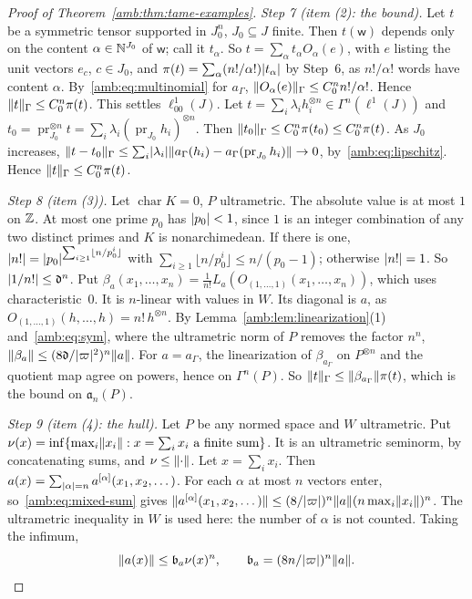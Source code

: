 \begin{proof}[Proof of Theorem~\ref{amb:thm:tame-examples}]
\emph{Step 7 (item (2): the bound).} Let $t$ be a symmetric tensor supported in $J_0^n$, $J_0\subseteq J$ finite. Then $t(\mathsf w)$
depends only on the content $\alpha\in\mathbb N^{J_0}$ of $\mathsf w$; call it $t_\alpha$. So $t=\sum_\alpha t_\alpha O_\alpha(e)$, with $e$
listing the unit vectors $e_c$, $c\in J_0$, and $\pi(t)=\sum_\alpha(n!/\alpha!)\lvert t_\alpha\rvert$ by Step~6, as $n!/\alpha!$ words have
content $\alpha$. By~\eqref{amb:eq:multinomial} for $a_\Gamma$, $\lVert O_\alpha(e)\rVert_\Gamma\le C_0^nn!/\alpha!$. Hence
$\lVert t\rVert_\Gamma\le C_0^n\pi(t)$. This settles $\ell^1_{00}(J)$. Let $t=\sum_i\lambda_ih_i^{\otimes n}\in\Gamma^n(\ell^1(J))$ and
$t_0=\operatorname{pr}_{J_0}^{\otimes n}t=\sum_i\lambda_i(\operatorname{pr}_{J_0}h_i)^{\otimes n}$. Then
$\lVert t_0\rVert_\Gamma\le C_0^n\pi(t_0)\le C_0^n\pi(t)$. As $J_0$ increases,
$\lVert t-t_0\rVert_\Gamma\le\sum_i\lvert \lambda_i\rvert\lVert a_\Gamma(h_i)-a_\Gamma(\operatorname{pr}_{J_0}h_i)\rVert\to0$, by~\eqref{amb:eq:lipschitz}.
Hence $\lVert t\rVert_\Gamma\le C_0^n\pi(t)$.

\emph{Step 8 (item (3)).} Let $\operatorname{char}K=0$, $P$ ultrametric. The absolute value is at most $1$ on $\mathbb Z$. At most one prime $p_0$
has $\lvert p_0\rvert<1$, since $1$ is an integer combination of any two distinct primes and $K$ is nonarchimedean. If there is one,
$\lvert n!\rvert=\lvert p_0\rvert^{\sum_{i\ge1}\lfloor n/p_0^i\rfloor}$ with $\sum_{i\ge1}\lfloor n/p_0^i\rfloor\le n/(p_0-1)$; otherwise
$\lvert n!\rvert=1$. So $\lvert 1/n!\rvert\le\mathfrak d^n$. Put
$\beta_a(x_1,\dots,x_n)=\frac1{n!}L_a(O_{(1,\dots,1)}(x_1,\dots,x_n))$, which uses characteristic~$0$. It is
$n$\nobreakdash-linear with values in $W$. Its diagonal is $a$, as $O_{(1,\dots,1)}(h,\dots,h)=n!\,h^{\otimes n}$. By
Lemma~\ref{amb:lem:linearization}(1) and~\eqref{amb:eq:sym}, where the ultrametric norm of $P$ removes the factor $n^n$,
$\lVert \beta_a\rVert\le(8\mathfrak d/\lvert \varpi\rvert^2)^n\lVert a\rVert$. For $a=a_\Gamma$, the linearization of
$\beta_{a_\Gamma}$ on $P^{\otimes n}$ and the quotient map agree on powers, hence on $\Gamma^n(P)$. So
$\lVert t\rVert_\Gamma\le\lVert \beta_{a_\Gamma}\rVert\pi(t)$, which is the bound on $\mathfrak a_n(P)$.

\emph{Step 9 (item (4): the hull).} Let $P$ be any normed space and $W$ ultrametric. Put
$\nu(x)=\inf\{\max_i\lVert x_i\rVert:x=\sum_ix_i\text{ a finite sum}\}$. It is an ultrametric seminorm, by concatenating sums, and
$\nu\le\lVert \cdot\rVert$. Let $x=\sum_ix_i$. Then $a(x)=\sum_{\lvert \alpha\rvert=n}a^{[\alpha]}(x_1,x_2,\dots)$. For each $\alpha$ at most $n$
vectors enter, so~\eqref{amb:eq:mixed-sum} gives $\lVert a^{[\alpha]}(x_1,x_2,\dots)\rVert\le(8/\lvert \varpi\rvert)^n\lVert a\rVert(n\max_i\lVert x_i\rVert)^n$.
The ultrametric inequality in $W$ is used here: the number of $\alpha$ is not counted. Taking the infimum,
\begin{equation}\label{amb:d:eq:hull-bound}
 \lVert a(x)\rVert\le \mathfrak b_a\nu(x)^n,\qquad \mathfrak b_a=(8n/\lvert \varpi\rvert)^n\lVert a\rVert.
\end{equation}


\end{proof}
